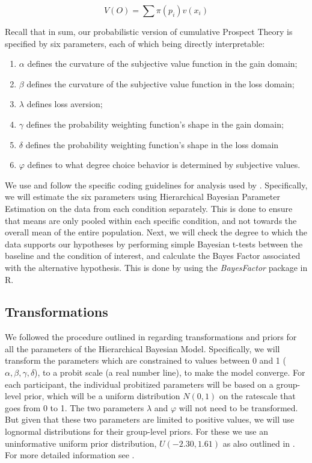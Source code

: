 \documentclass{article}
\begin{document}
$$V(O) = \sum \pi (p_i)v(x_i) $$

Recall that in sum, our probabilistic version of cumulative Prospect Theory is specified by six parameters, each of which being directly interpretable:

\begin{enumerate}
    \item $\alpha$ defines the curvature of the subjective value function in the gain domain;
    \item $\beta$ defines the curvature of the subjective value function in the loss domain;
    \item $\lambda$ defines loss aversion;
    \item $\gamma$ defines the probability weighting function’s shape in the gain domain;
    \item $\delta$ defines the probability weighting function’s shape in the loss domain
    \item $\varphi$ defines to what degree choice behavior is determined by subjective values.
\end{enumerate}
We use and follow the specific coding guidelines for analysis used by \cite{nilsson2011jomp}. Specifically, we will estimate the six parameters using Hierarchical Bayesian Parameter Estimation on the data from each condition separately. This is done to ensure that means are only pooled within each specific condition, and not towards the overall mean of the entire population. Next, we will check the degree to which the data supports our hypotheses by performing simple Bayesian t-tests between the baseline and the condition of interest, and calculate the Bayes Factor associated with the alternative hypothesis. This is done by using the \textit{BayesFactor} package in R. 

    \subsection{Transformations}

    We followed the procedure outlined in  regarding transformations and priors for all the parameters of the Hierarchical Bayesian Model. Specifically, we will transform the parameters which are constrained to values between 0 and 1 ($\alpha, \beta, \gamma,\delta$), to a probit scale (a real number line), to make the model converge. For each participant, the individual probitized parameters will be based on a group-level prior, which will be a uniform distribution $N(0,1)$ on the ratescale that goes from 0 to 1.
The two parameters $\lambda$ and $\varphi$ will not need to be transformed. But given that these two parameters are limited to positive values, we will use lognormal distributions for their group-level priors. For these we use an uninformative uniform prior distribution, $U(-2.30, 1.61)$ as also outlined in \cite{nilsson2011jomp}.
For more detailed information see .
\end{document}
